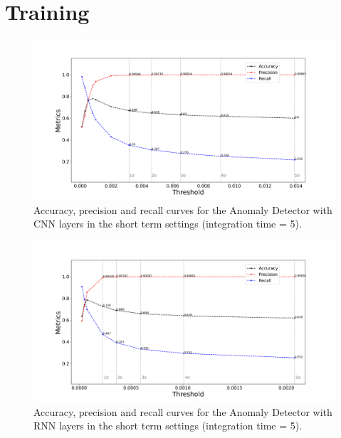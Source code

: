 \section{Training}
\label{s:appendix-b}


\begin{figure}[!htb]
    \centering
    \includegraphics[width=\linewidth]{figures/experiments/metrics/cnn_metrics_test_set_all_itime_5.png}
    \caption{Accuracy, precision and recall curves for the Anomaly Detector with CNN layers in the short term settings (integration time = 5).}
    \label{fig:cnn-metrics-itime-5-appendix}
\end{figure}

\begin{figure}[!htb]
    \centering
    \includegraphics[width=\linewidth]{figures/experiments/metrics/rnn_metrics_test_set_all_itime_5.png}
    \caption{Accuracy, precision and recall curves for the Anomaly Detector with RNN layers in the short term settings (integration time = 5).}
    \label{fig:rnn-metrics-itime-5-appendix}
\end{figure}

